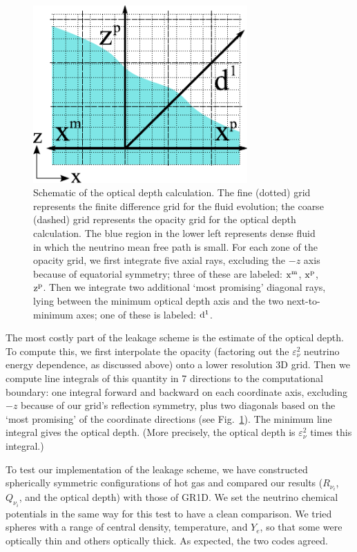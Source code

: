 \begin{figure}
\includegraphics[width=8.2cm]{Figures/chi_opacity_grid}
\caption[Schematic of optical depth calculation]{
Schematic of the optical depth calculation. The fine (dotted) grid
represents the finite difference grid for the fluid evolution; the coarse
(dashed) grid represents the opacity grid for the optical depth calculation.
The blue region in the lower left represents dense fluid in which the neutrino
mean free path is small. For each zone of the opacity grid, we first integrate
five axial rays, excluding the $-z$
axis because of equatorial symmetry; three of these are labeled:
$\rm x^m$, $\rm x^p$, $\rm z^p$.
Then we integrate two additional `most promising' diagonal rays,
lying between the minimum optical depth axis and the two next-to-minimum axes;
one of these is labeled: $\rm d^1$.
}
\label{fig:chi_opacity_grid}
\end{figure}

The most costly part of the leakage scheme is the estimate of the
optical depth.  To compute this, we first interpolate the opacity
(factoring out the $\varepsilon_{\nu}^2$ neutrino energy dependence, as discussed
above) onto a lower resolution 3D grid.  Then we compute
line integrals of this quantity in 7 directions to the computational boundary:
one integral forward and backward on each coordinate axis, excluding $-z$ because of our
grid's reflection symmetry, plus two diagonals based on the `most
promising' of the coordinate directions (see Fig.~\ref{fig:chi_opacity_grid}).
The minimum line integral gives the optical depth.
(More precisely, the optical depth is $\varepsilon_{\nu}^2$ times this integral.)

To test our implementation of the leakage scheme, we have constructed
spherically symmetric configurations of hot gas and compared our
results ($R_{\nu_i}$, $Q_{\nu_i}$, and the optical depth) with those
of GR1D.  We set the neutrino chemical potentials in the same way for
this test to have a clean comparison.  We tried spheres with a range of
central density, temperature,
and $Y_e$, so that some were optically thin and others optically thick. 
As expected, the two codes agreed.


